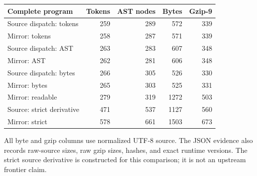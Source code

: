\begin{center}\small
\begin{tabular}{lrrrr}
\toprule
Complete program & Tokens & AST nodes & Bytes & Gzip-9\\
\midrule
Source dispatch: tokens & 259 & 289 & 572 & 339\\
Mirror: tokens & 258 & 287 & 571 & 339\\
\midrule
Source dispatch: AST & 263 & 283 & 607 & 348\\
Mirror: AST & 262 & 281 & 606 & 348\\
\midrule
Source dispatch: bytes & 266 & 305 & 526 & 330\\
Mirror: bytes & 265 & 303 & 525 & 331\\
\midrule
Mirror: readable & 279 & 319 & 1272 & 503\\
\midrule
Source: strict derivative & 471 & 537 & 1127 & 560\\
Mirror: strict & 578 & 661 & 1503 & 673\\
\bottomrule
\end{tabular}
\end{center}
All byte and gzip columns use normalized UTF-8 source. The JSON evidence also records raw-source sizes, raw gzip sizes, hashes, and exact runtime versions. The strict source derivative is constructed for this comparison; it is not an upstream frontier claim.

